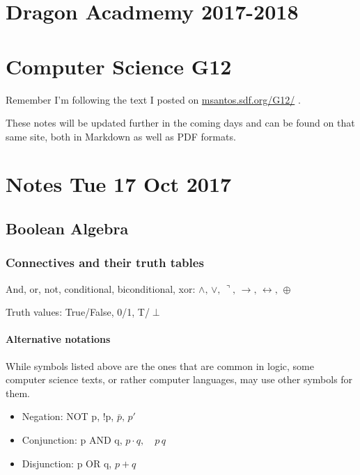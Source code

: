 \section{Dragon Acadmemy 2017-2018}\label{dragon-acadmemy-2017-2018}

\section{Computer Science G12}\label{computer-science-g12}

Remember I'm following the text I posted on
\href{http://msantos.sdf.org/G12/Term1/AnIntroductionToLogic-2016-MarkVLawson.pdf}{msantos.sdf.org/G12/}
.

These notes will be updated further in the coming days and can be found
on that same site, both in Markdown as well as PDF formats.

\section{Notes Tue 17 Oct 2017}\label{notes-tue-17-oct-2017}

\subsection{Boolean Algebra}\label{boolean-algebra}

\subsubsection{Connectives and their truth
tables}\label{connectives-and-their-truth-tables}

And, or, not, conditional, biconditional, xor:
\(\wedge,\,\vee,\,\urcorner,\,\rightarrow,\,\leftrightarrow,\,\oplus\)

Truth values: True/False, 0/1, T/\(\perp\)

\paragraph{Alternative notations}\label{alternative-notations}

While symbols listed above are the ones that are common in logic, some
computer science texts, or rather computer languages, may use other
symbols for them.

\begin{itemize}
\tightlist
\item
  Negation: NOT p, !p, \(\bar{p},\, p'\)
\item
  Conjunction: p AND q, \(p\cdot q,\quad p\,q\)
\item
  Disjunction: p OR q, \(p + q\)
\end{itemize}

